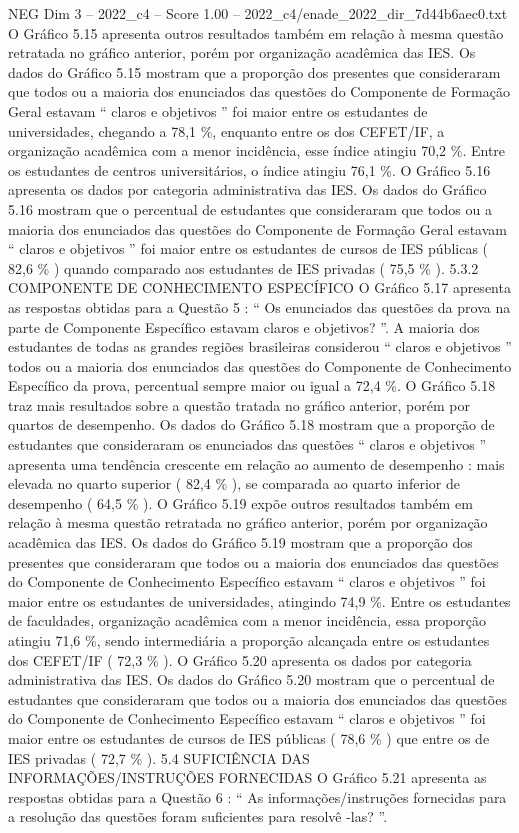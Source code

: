 \begin{textsample}{NEG Dim 3 – 2022\_c4 – Score 1.00 – 2022\_c4/enade\_2022\_dir\_7d44b6aec0.txt}
O Gráfico 5.15 apresenta outros resultados também em relação à mesma questão retratada no gráfico anterior, porém por organização acadêmica das IES.
Os dados do Gráfico 5.15 mostram que a proporção dos presentes que consideraram que todos ou a maioria dos enunciados das questões do Componente de Formação Geral estavam “ claros e objetivos ” foi maior entre os estudantes de universidades, chegando a 78,1 \%, enquanto entre os dos CEFET/IF, a organização acadêmica com a menor incidência, esse índice atingiu 70,2 \%.
Entre os estudantes de centros universitários, o índice atingiu 76,1 \%.
O Gráfico 5.16 apresenta os dados por categoria administrativa das IES.
Os dados do Gráfico 5.16 mostram que o percentual de estudantes que consideraram que todos ou a maioria dos enunciados das questões do Componente de Formação Geral estavam “ claros e objetivos ” foi maior entre os estudantes de cursos de IES públicas ( 82,6 \% ) quando comparado aos estudantes de IES privadas ( 75,5 \% ). 5.3.2 COMPONENTE DE CONHECIMENTO ESPECÍFICO O Gráfico 5.17 apresenta as respostas obtidas para a Questão 5 : “ Os enunciados das questões da prova na parte de Componente Específico estavam claros e objetivos? ”.
A maioria dos estudantes de todas as grandes regiões brasileiras considerou “ claros e objetivos ” todos ou a maioria dos enunciados das questões do Componente de Conhecimento Específico da prova, percentual sempre maior ou igual a 72,4 \%.
O Gráfico 5.18 traz mais resultados sobre a questão tratada no gráfico anterior, porém por quartos de desempenho.
Os dados do Gráfico 5.18 mostram que a proporção de estudantes que consideraram os enunciados das questões “ claros e objetivos ” apresenta uma tendência crescente em relação ao aumento de desempenho : mais elevada no quarto superior ( 82,4 \% ), se comparada ao quarto inferior de desempenho ( 64,5 \% ).
O Gráfico 5.19 expõe outros resultados também em relação à mesma questão retratada no gráfico anterior, porém por organização acadêmica das IES.
Os dados do Gráfico 5.19 mostram que a proporção dos presentes que consideraram que todos ou a maioria dos enunciados das questões do Componente de Conhecimento Específico estavam “ claros e objetivos ” foi maior entre os estudantes de universidades, atingindo 74,9 \%.
Entre os estudantes de faculdades, organização acadêmica com a menor incidência, essa proporção atingiu 71,6 \%, sendo intermediária a proporção alcançada entre os estudantes dos CEFET/IF ( 72,3 \% ).
O Gráfico 5.20 apresenta os dados por categoria administrativa das IES.
Os dados do Gráfico 5.20 mostram que o percentual de estudantes que consideraram que todos ou a maioria dos enunciados das questões do Componente de Conhecimento Específico estavam “ claros e objetivos ” foi maior entre os estudantes de cursos de IES públicas ( 78,6 \% ) que entre os de IES privadas ( 72,7 \% ). 5.4 SUFICIÊNCIA DAS INFORMAÇÕES/INSTRUÇÕES FORNECIDAS O Gráfico 5.21 apresenta as respostas obtidas para a Questão 6 : “ As informações/instruções fornecidas para a resolução das questões foram suficientes para resolvê -las? ”.

\end{textsample}
